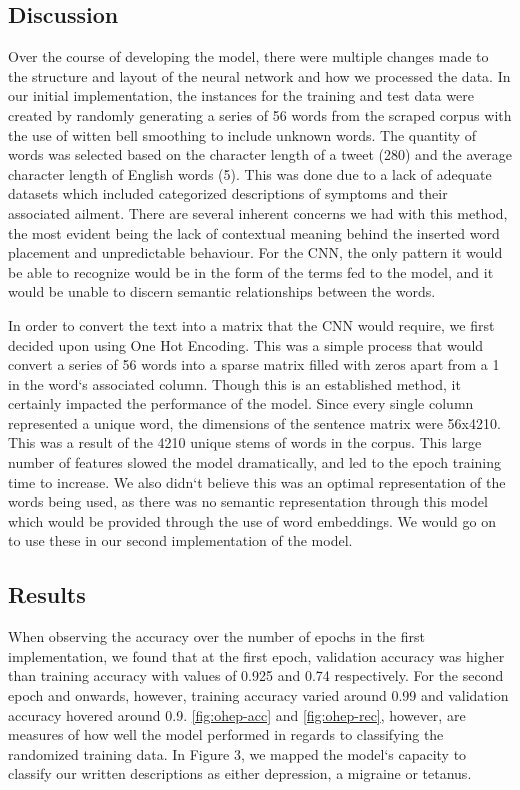 \documentclass[12pt]{report}
\begin{document}
\subsection{Discussion}
Over the course of developing the model, there were multiple changes made to the
structure and layout of the neural network and how we processed the data. In our
initial implementation, the instances for the training and test data were created
by randomly generating a series of 56 words from the scraped corpus with the use
of witten bell smoothing to include unknown words. The quantity of words was selected
based on the character length of a tweet (280) and the average character length of
English words (5). This was done due to a lack of adequate datasets which included
categorized descriptions of symptoms and their associated ailment. There are several
inherent concerns we had with this method, the most evident being the lack of contextual
meaning behind the inserted word placement and unpredictable behaviour. For the CNN, the
only pattern it would be able to recognize would be in the form of the terms fed to the
model, and it would be unable to discern semantic relationships between the words.

In order to convert the text into a matrix that the CNN would require, we first decided
upon using One Hot Encoding. This was a simple process that would convert a series of 56
words into a sparse matrix filled with zeros apart from a 1 in the word`s associated column.
Though this is an established method, it certainly impacted the performance of the model.
Since every single column represented a unique word, the dimensions of the sentence matrix
were 56x4210. This was a result of the 4210 unique stems of words in the corpus. This large
number of features slowed the model dramatically, and led to the epoch training time to increase.
We also didn`t believe this was an optimal representation of the words being used, as there was
no semantic representation through this model which would be provided through the use of word
embeddings. We would go on to use these in our second implementation of the model.

\subsection{Results}
When observing the accuracy over the number of epochs in the first implementation,
we found that at the first epoch, validation accuracy was higher than training
accuracy with values of 0.925 and 0.74 respectively. For the second epoch and onwards,
however, training accuracy varied around 0.99 and validation accuracy hovered around
0.9. \ref{fig:ohep-acc} and \ref{fig:ohep-rec}, however, are measures of how well the model performed
in regards to classifying the randomized training data. In Figure 3, we mapped the
model`s capacity to classify our written descriptions as either depression, a
migraine or tetanus.
\end{document}
